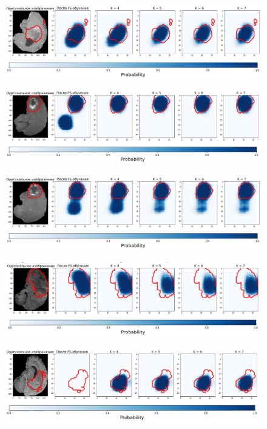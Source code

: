 \begin{figure}[h!] 
  \center
  \includegraphics [scale=0.7] {images/good_10.png}
\end{figure}

\begin{figure}[h!] 
  \center
  \includegraphics [scale=0.7] {images/good_11.png}
\end{figure}

\begin{figure}[h!] 
  \center
  \includegraphics [scale=0.7] {images/good_12.png}
\end{figure}

\begin{figure}[h!] 
  \center
  \includegraphics [scale=0.7] {images/good_13.png}
\end{figure}

\begin{figure}[h!] 
  \center
  \includegraphics [scale=0.7] {images/good_14.png}
\end{figure}

